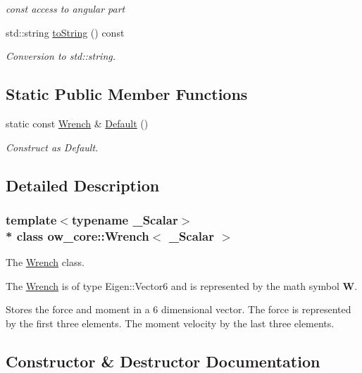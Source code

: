 \begin{DoxyCompactItemize}
\begin{DoxyCompactList}\small\item\em const access to angular part \end{DoxyCompactList}\item 
std\+::string \hyperlink{classow__core_1_1Wrench_a5b9957b13debc043deab64b5f5467504}{to\+String} () const \hypertarget{classow__core_1_1Wrench_a5b9957b13debc043deab64b5f5467504}{}\label{classow__core_1_1Wrench_a5b9957b13debc043deab64b5f5467504}

\begin{DoxyCompactList}\small\item\em Conversion to std\+::string. \end{DoxyCompactList}\end{DoxyCompactItemize}
\subsection*{Static Public Member Functions}
\begin{DoxyCompactItemize}
\item 
static const \hyperlink{classow__core_1_1Wrench}{Wrench} \& \hyperlink{classow__core_1_1Wrench_a3dc8f10073ab93f15eb839b2a0fef07e}{Default} ()
\begin{DoxyCompactList}\small\item\em Construct as Default. \end{DoxyCompactList}\end{DoxyCompactItemize}


\subsection{Detailed Description}
\subsubsection*{template$<$typename \+\_\+\+Scalar$>$\\*
class ow\+\_\+core\+::\+Wrench$<$ \+\_\+\+Scalar $>$}

The \hyperlink{classow__core_1_1Wrench}{Wrench} class. 

The \hyperlink{classow__core_1_1Wrench}{Wrench} is of type Eigen\+::\+Vector6 and is represented by the math symbol $\mathbf{W}$.

Stores the force and moment in a 6 dimensional vector. The force is represented by the first three elements. The moment velocity by the last three elements. 

\subsection{Constructor \& Destructor Documentation}
